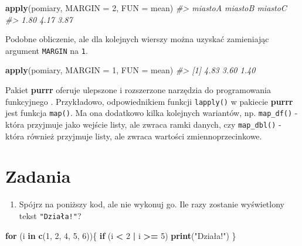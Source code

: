 \documentclass[paper=6in:9in,pagesize=pdftex,headinclude=on,footinclude=on,10pt]{scrbook}
\newenvironment{Shaded}{\begin{snugshade}}{\end{snugshade}}
\newcommand{\CommentTok}[1]{\textcolor[rgb]{0.56,0.35,0.01}{\textit{#1}}}
\newcommand{\ControlFlowTok}[1]{\textcolor[rgb]{0.13,0.29,0.53}{\textbf{#1}}}
\newcommand{\DataTypeTok}[1]{\textcolor[rgb]{0.13,0.29,0.53}{#1}}
\newcommand{\DecValTok}[1]{\textcolor[rgb]{0.00,0.00,0.81}{#1}}
\newcommand{\KeywordTok}[1]{\textcolor[rgb]{0.13,0.29,0.53}{\textbf{#1}}}
\newcommand{\NormalTok}[1]{#1}
\newcommand{\OperatorTok}[1]{\textcolor[rgb]{0.81,0.36,0.00}{\textbf{#1}}}
\newcommand{\StringTok}[1]{\textcolor[rgb]{0.31,0.60,0.02}{#1}}
\providecommand{\tightlist}{%
  \setlength{\itemsep}{0pt}\setlength{\parskip}{0pt}}
\let\BeginKnitrBlock\begin \let\EndKnitrBlock\end
\begin{document}
\begin{Shaded}
\begin{Highlighting}[]
\KeywordTok{apply}\NormalTok{(pomiary, }\DataTypeTok{MARGIN =} \DecValTok{2}\NormalTok{, }\DataTypeTok{FUN =}\NormalTok{ mean)}
\CommentTok{#> miastoA miastoB miastoC }
\CommentTok{#>    1.80    4.17    3.87}
\end{Highlighting}
\end{Shaded}

Podobne obliczenie, ale dla kolejnych wierszy można uzyskać zamieniając argument \texttt{MARGIN} na \texttt{1}.

\begin{Shaded}
\begin{Highlighting}[]
\KeywordTok{apply}\NormalTok{(pomiary, }\DataTypeTok{MARGIN =} \DecValTok{1}\NormalTok{, }\DataTypeTok{FUN =}\NormalTok{ mean)}
\CommentTok{#> [1] 4.83 3.60 1.40}
\end{Highlighting}
\end{Shaded}

\BeginKnitrBlock{rmdinfo}
Pakiet \textbf{purrr} oferuje ulepszone i rozszerzone narzędzia do programowania funkcyjnego \citep{R-purrr}.
Przykładowo, odpowiednikiem funkcji \texttt{lapply()} w pakiecie \textbf{purrr} jest funkcja \texttt{map()}.
Ma ona dodatkowo kilka kolejnych wariantów, np. \texttt{map\_df()} - która przyjmuje jako wejście listy, ale zwraca ramki danych, czy \texttt{map\_dbl()} - która również przyjmuje listy, ale zwraca wartości zmiennoprzecinkowe.
\EndKnitrBlock{rmdinfo}

\hypertarget{zadania-7}{%
\section{Zadania}\label{zadania-7}}

\begin{enumerate}
\def\labelenumi{\arabic{enumi})}
\tightlist
\item
  Spójrz na poniższy kod, ale nie wykonuj go.
  Ile razy zostanie wyświetlony tekst \texttt{"Działa!"}?
\end{enumerate}

\begin{Shaded}
\begin{Highlighting}[]
\ControlFlowTok{for}\NormalTok{ (i }\ControlFlowTok{in} \KeywordTok{c}\NormalTok{(}\DecValTok{1}\NormalTok{, }\DecValTok{2}\NormalTok{, }\DecValTok{4}\NormalTok{, }\DecValTok{5}\NormalTok{, }\DecValTok{6}\NormalTok{))\{}
    \ControlFlowTok{if}\NormalTok{ (i }\OperatorTok{<}\StringTok{ }\DecValTok{2} \OperatorTok{|}\StringTok{ }\NormalTok{i }\OperatorTok{>=}\StringTok{ }\DecValTok{5}\NormalTok{)}
      \KeywordTok{print}\NormalTok{(}\StringTok{"Działa!"}\NormalTok{)}
\NormalTok{\}}
\end{Highlighting}
\end{Shaded}
\end{document}
